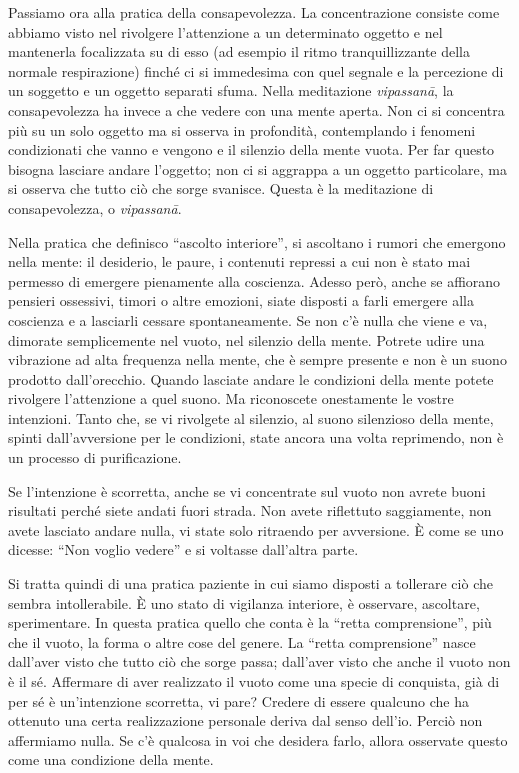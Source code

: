 
Passiamo ora alla pratica della consapevolezza. La concentrazione
consiste come abbiamo visto nel rivolgere l'attenzione a un determinato
oggetto e nel mantenerla focalizzata su di esso (ad esempio il ritmo
tranquillizzante della normale respirazione) finché ci si immedesima con
quel segnale e la percezione di un soggetto e un oggetto separati sfuma.
Nella meditazione \textit{vipassanā}, la consapevolezza ha invece a che vedere
con una mente aperta. Non ci si concentra più su un solo oggetto ma si
osserva in profondità, contemplando i fenomeni condizionati che vanno e
vengono e il silenzio della mente vuota. Per far questo bisogna lasciare
andare l'oggetto; non ci si aggrappa a un oggetto particolare, ma si
osserva che tutto ciò che sorge svanisce. Questa è la meditazione di
consapevolezza, o \textit{vipassanā}.

Nella pratica che definisco ``ascolto interiore'', si ascoltano i rumori
che emergono nella mente: il desiderio, le paure, i contenuti repressi a
cui non è stato mai permesso di emergere pienamente alla coscienza.
Adesso però, anche se affiorano pensieri ossessivi, timori o altre
emozioni, siate disposti a farli emergere alla coscienza e a lasciarli
cessare spontaneamente. Se non c'è nulla che viene e va, dimorate
semplicemente nel vuoto, nel silenzio della mente. Potrete udire una
vibrazione ad alta frequenza nella mente, che è sempre presente e non è
un suono prodotto dall'orecchio. Quando lasciate andare le condizioni
della mente potete rivolgere l'attenzione a quel suono. Ma riconoscete
onestamente le vostre intenzioni. Tanto che, se vi rivolgete al
silenzio, al suono silenzioso della mente, spinti dall'avversione per le
condizioni, state ancora una volta reprimendo, non è un processo di
purificazione.

Se l'intenzione è scorretta, anche se vi concentrate sul vuoto non
avrete buoni risultati perché siete andati fuori strada. Non avete
riflettuto saggiamente, non avete lasciato andare nulla, vi state solo
ritraendo per avversione. È come se uno dicesse: ``Non voglio vedere'' e
si voltasse dall'altra parte.

Si tratta quindi di una pratica paziente in cui siamo disposti a
tollerare ciò che sembra intollerabile. È uno stato di vigilanza
interiore, è osservare, ascoltare, sperimentare. In questa pratica
quello che conta è la ``retta comprensione'', più che il vuoto, la forma o
altre cose del genere. La ``retta comprensione'' nasce dall'aver visto che
tutto ciò che sorge passa; dall'aver visto che anche il vuoto non è il
sé. Affermare di aver realizzato il vuoto come una specie di conquista,
già di per sé è un'intenzione scorretta, vi pare? Credere di essere
qualcuno che ha ottenuto una certa realizzazione personale deriva dal
senso dell'io. Perciò non affermiamo nulla. Se c'è qualcosa in voi che
desidera farlo, allora osservate questo come una condizione della mente.


